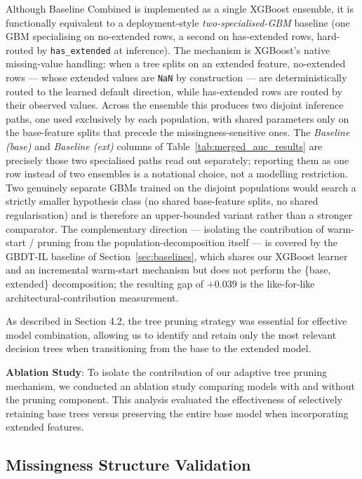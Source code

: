 \documentclass[sigconf]{acmart}
\begin{document}
\begin{itemize}
\begin{enumerate}
Although Baseline Combined is implemented as a single XGBoost ensemble, it is functionally equivalent to a deployment-style \textit{two-specialised-GBM} baseline (one GBM specialising on no-extended rows, a second on has-extended rows, hard-routed by \texttt{has\_extended} at inference). The mechanism is XGBoost's native missing-value handling: when a tree splits on an extended feature, no-extended rows --- whose extended values are \texttt{NaN} by construction --- are deterministically routed to the learned default direction, while has-extended rows are routed by their observed values. Across the ensemble this produces two disjoint inference paths, one used exclusively by each population, with shared parameters only on the base-feature splits that precede the missingness-sensitive ones. The \emph{Baseline (base)} and \emph{Baseline (ext)} columns of Table~\ref{tab:merged_auc_results} are precisely those two specialised paths read out separately; reporting them as one row instead of two ensembles is a notational choice, not a modelling restriction. Two genuinely separate GBMs trained on the disjoint populations would search a strictly smaller hypothesis class (no shared base-feature splits, no shared regularisation) and is therefore an upper-bounded variant rather than a stronger comparator. The complementary direction --- isolating the contribution of warm-start / pruning from the population-decomposition itself --- is covered by the GBDT-IL baseline of Section~\ref{sec:baselines}, which shares our XGBoost learner and an incremental warm-start mechanism but does not perform the \{base, extended\} decomposition; the resulting gap of $+0.039$ is the like-for-like architectural-contribution measurement.
\end{enumerate}

As described in Section 4.2, the tree pruning strategy was essential for effective model combination, allowing us to identify and retain only the most relevant decision trees when transitioning from the base to the extended model.

\textbf{Ablation Study}: To isolate the contribution of our adaptive tree pruning mechanism, we conducted an ablation study comparing models with and without the pruning component. This analysis evaluated the effectiveness of selectively retaining base trees versus preserving the entire base model when incorporating extended features.

\subsection{Missingness Structure Validation}
\label{sec:missingness-validation}


\end{itemize}
\end{document}
